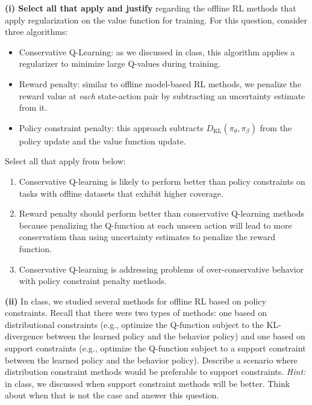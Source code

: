 \documentclass[12pt]{article}
\begin{document}
\textbf{(i) Select all that apply and justify} regarding the offline RL methods that apply regularization on the value function for training. For this question, consider three algorithms:
    \begin{itemize}
        \item Conservative Q-Learning: as we discussed in class, this algorithm applies a regularizer to minimize large Q-values during training.
        \item Reward penalty: similar to offline model-based RL methods, we penalize the reward value at \emph{each} state-action pair by subtracting an uncertainty estimate from it.
        \item Policy constraint penalty: this approach subtracts $D_\mathrm{KL}(\pi_\theta, \pi_\beta)$ from the policy update and the value function update. 
    \end{itemize}

    Select all that apply from below:
    \begin{enumerate}
        \item Conservative Q-learning is likely to perform better than policy constraints on tasks with offline datasets that exhibit higher coverage. 
        \item Reward penalty should perform better than conservative Q-learning methods because penalizing the Q-function at each unseen action will lead to more conservatism than using uncertainty estimates to penalize the reward function.
        \item Conservative Q-learning is addressing problems of over-conservative behavior with policy constraint penalty methods.
    \end{enumerate}

\begin{tcolorbox}[fit,height=10em, width=40em, blank, borderline={1pt}{1pt},nobeforeafter]
            \begin{center}
            \end{center}
            \end{tcolorbox}

\textbf{(ii)} In class, we studied several methods for offline RL based on policy constraints. Recall that there were two types of methods: one based on distributional constraints (e.g., optimize the Q-function subject to the KL-divergence between the learned policy and the behavior policy) and one based on support constraints (e.g., optimize the Q-function subject to a support constraint between the learned policy and the behavior policy). Describe a scenario where distribution constraint methods would be preferable to support constraints. \textit{Hint:} in class, we discussed when support constraint methods will be better. Think about when that is not the case and answer this question.
\end{document}
